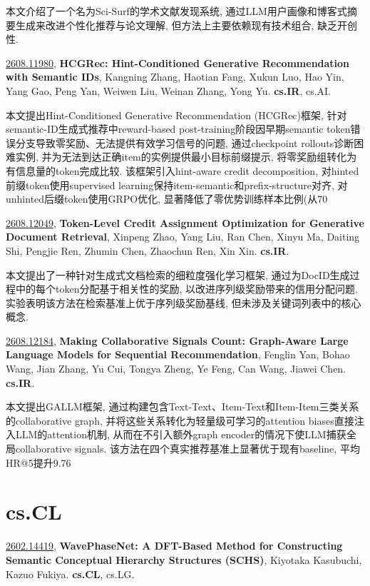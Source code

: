 \documentclass[9pt, a4paper]{article}
\theoremstyle{plain}
\theoremstyle{definition}
\theoremstyle{remark}
\newcommand{\arxivwithtarget}[3]{\hypertarget{#1}{}\href{https://arxiv.org/abs/#1}{#1}, \textbf{\textcolor{arxivblue}{#2}}, #3. }
\begin{document}
本文介绍了一个名为Sci-Surf的学术文献发现系统, 通过LLM用户画像和博客式摘要生成来改进个性化推荐与论文理解, 但方法上主要依赖现有技术组合, 缺乏开创性.


\arxivwithtarget{2608.11980}{HCGRec: Hint-Conditioned Generative Recommendation with Semantic IDs}{Kangning Zhang, Haotian Fang, Xukun Luo, Hao Yin, Yang Gao, Peng Yan, Weiwen Liu, Weinan Zhang, Yong Yu}\textbf{cs.IR}, cs.AI.

本文提出Hint-Conditioned Generative Recommendation (HCGRec)框架, 针对semantic-ID生成式推荐中reward-based post-training阶段因早期semantic token错误分支导致零奖励、无法提供有效学习信号的问题, 通过checkpoint rollouts诊断困难实例, 并为无法到达正确item的实例提供最小目标前缀提示, 将零奖励组转化为有信息量的token完成比较. 该框架引入hint-aware credit decomposition, 对hinted前缀token使用supervised learning保持item-semantic和prefix-structure对齐, 对unhinted后缀token使用GRPO优化, 显著降低了零优势训练样本比例(从70%


\arxivwithtarget{2608.12049}{Token-Level Credit Assignment Optimization for Generative Document Retrieval}{Xinpeng Zhao, Yang Liu, Ran Chen, Xinyu Ma, Daiting Shi, Pengjie Ren, Zhumin Chen, Zhaochun Ren, Xin Xin}\textbf{cs.IR}.

本文提出了一种针对生成式文档检索的细粒度强化学习框架, 通过为DocID生成过程中的每个token分配基于相关性的奖励, 以改进序列级奖励带来的信用分配问题. 实验表明该方法在检索基准上优于序列级奖励基线, 但未涉及关键词列表中的核心概念.


\arxivwithtarget{2608.12184}{Making Collaborative Signals Count: Graph-Aware Large Language Models for Sequential Recommendation}{Fenglin Yan, Bohao Wang, Jian Zhang, Yu Cui, Tongya Zheng, Ye Feng, Can Wang, Jiawei Chen}\textbf{cs.IR}.

本文提出GALLM框架, 通过构建包含Text-Text、Item-Text和Item-Item三类关系的collaborative graph, 并将这些关系转化为轻量级可学习的attention biases直接注入LLM的attention机制, 从而在不引入额外graph encoder的情况下使LLM捕获全局collaborative signals. 该方法在四个真实推荐基准上显著优于现有baseline, 平均HR@5提升9.76%


\section{cs.CL}
\arxivwithtarget{2602.14419}{WavePhaseNet: A DFT-Based Method for Constructing Semantic Conceptual Hierarchy Structures (SCHS)}{Kiyotaka Kasubuchi, Kazuo Fukiya}\textbf{cs.CL}, cs.LG.
\end{document}
